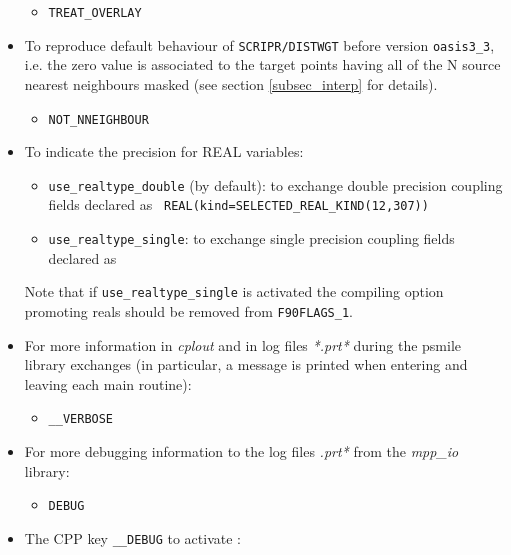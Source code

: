 \begin{itemize}
  \begin{itemize}
  \item {\tt TREAT\_OVERLAY}
  \end{itemize} 

\item To reproduce default behaviour of {\tt SCRIPR/DISTWGT} before
  version {\tt oasis3\_3}, i.e. the zero value is associated to the
  target points having all of the N source nearest neighbours masked
  (see section \ref{subsec_interp} for details).
  \begin{itemize}
  \item {\tt NOT\_NNEIGHBOUR}
  \end{itemize} 
  
\item To indicate the precision for REAL variables:

  \begin{itemize}
  \item {\tt use\_realtype\_double} (by default): to exchange double
    precision coupling fields declared as {\tt
      REAL(kind=SELECTED\_REAL\_KIND(12,307))}
  \item {\tt use\_realtype\_single}: to exchange single precision coupling
    fields declared as 
  \end{itemize}
  Note that if {\tt use\_realtype\_single} is activated the compiling
  option promoting reals should be removed from {\tt F90FLAGS\_1}.

\item For more information in {\it cplout} and in log files {\it
    *.prt*} during the psmile library exchanges (in particular,
    a message is printed when entering and leaving each main routine):
  \begin{itemize}
  \item{\tt \_\_VERBOSE}
  \end{itemize}

\item For more debugging information to the log files {\it *.prt*}  from the
  {\it mpp\_io} library:
  \begin{itemize}
  \item{\tt DEBUG}
  \end{itemize}

\item The CPP key {\tt \_\_DEBUG} to activate :

  \begin{itemize}


\end{itemize}
\end{itemize}

